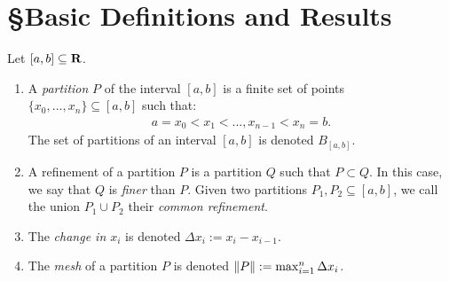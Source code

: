 \documentclass[10pt,twoside,openany]{memoir}
\begin{document}

\begin{abstract}
    This is an outline of many results related to the Darboux integral. Included are basic definitions, the integrability of continuous and monotone functions, the fundamental theorem of calculus, and limits of integrable functions. The culmination of this paper is proving Arzela's Theorem, which is a special case of the Bounded Convergence Theorem for the Lebesgue integral.
\end{abstract}

\section*{\S\:\:Basic Definitions and Results}
    \begin{definition}
        Let $[a,b] \subseteq \mathbf{R}$.
        \begin{enumerate}[label = (\arabic*),itemsep=1pt,topsep=3pt]
            \item A \textit{partition} $P$ of the interval $[a,b]$ is a finite set of points $\{x_0,...,x_n\} \subseteq [a,b]$ such that:
                \begin{equation*}
                \begin{split}
                    a = x_0 < x_1 < ... , x_{n-1} < x_n = b.
                \end{split}
                \end{equation*}
            The set of partitions of an interval $[a,b]$ is denoted $B_{[a,b]}$.
            \item A refinement of a partition $P$ is a partition $Q$ such that $P \subset Q$. In this case, we say that $Q$ is \textit{finer} than $P$. Given two partitions $P_1,P_2 \subseteq [a,b]$, we call the union $P_1 \cup P_2$ their \textit{common refinement}.
            \item The \textit{change in $x_i$} is denoted $\Delta x_i := x_{i} - x_{i-1}$.
            \item The \textit{mesh} of a partition $P$ is denoted $\left\lVert P \right\rVert := \max_{i = 1}^n \Delta x_i$.
        \end{enumerate}
    \end{definition}
\end{document}
